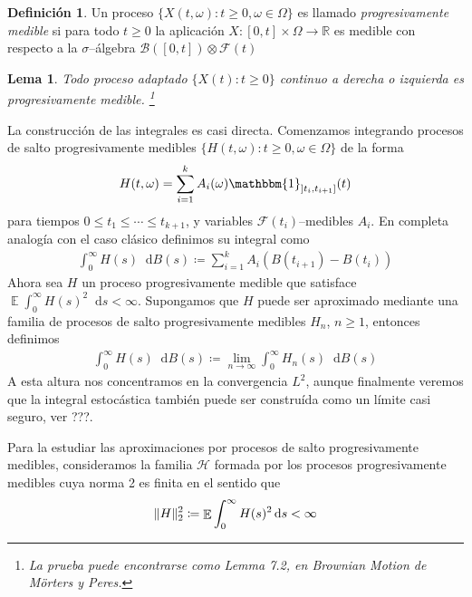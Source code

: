 \documentclass{article}
\newcommand{\morters}{Mörters}
\newcommand{\characteristic}{\mathbbm{1}}
\newcommand{\events}{\mathcal{F}}
\newcommand{\borel}{\mathcal{B}}
\newcommand{\brownian}{B}
\newcommand{\dd}{\mathop{}\!\mathrm{d}}
\newcommand{\realNumbers}{\mathbb{R}}
\DeclareMathOperator{\Expectation}{\mathbb{E}}
\DeclarePairedDelimiter{\norm}{\|}{\|}
\theoremstyle{plain}
\newtheorem{lemma}{Lema}
\theoremstyle{remark}
\theoremstyle{definition}
\newtheorem{definition}{Definición}
\begin{document}
\begin{definition}
  Un proceso \(\{X(t, \omega) : t \geq 0, \omega \in \Omega\}\) es llamado \emph{progresivamente medible} si para todo \(t \geq 0\) la aplicación \(X : [0, t] \times \Omega \rightarrow \realNumbers\) es medible con respecto a la \(\sigma\)--álgebra \(\borel([0, t]) \otimes \events(t)\)
\end{definition}

\begin{lemma}
  Todo proceso adaptado \(\{X(t) : t \geq 0\}\) continuo a derecha o izquierda es progresivamente medible.
  \footnote{La prueba puede encontrarse como Lemma 7.2, en Brownian Motion de \morters{} y Peres.}
\end{lemma}

La construcción de las integrales es casi directa.
Comenzamos integrando procesos de salto progresivamente medibles \(\{H(t, \omega) : t \geq 0, \omega \in \Omega\}\) de la forma
\begin{align}
  H(t, \omega)
  =
  \sum_{i = 1}^k A_i(\omega)\characteristic_{\left] t_i, t_{i + 1} \right]}(t)
\end{align}
para tiempos \(0 \leq t_1 \leq \cdots \leq t_{k + 1}\), y variables \(\events(t_i)\)--medibles \(A_i\).
En completa analogía con el caso clásico definimos su integral como
\begin{align}
  \int_0^{\infty} H(s) \dd \brownian(s)
  \coloneqq
  \sum_{i = 1}^k A_i (\brownian(t_{i + 1}) - \brownian(t_i))
\end{align}
Ahora sea \(H\) un proceso progresivamente medible que satisface \(\Expectation \int_0^{\infty} H(s)^2 \dd s < \infty\).
Supongamos que \(H\) puede ser aproximado mediante una familia de procesos de salto progresivamente medibles \(H_n\), \(n \geq 1\), entonces definimos
\begin{align}
  \int_0^\infty H(s) \dd \brownian(s)
  \coloneqq
  \lim_{n \rightarrow \infty} \int_0^\infty H_n(s) \dd \brownian(s)
  \label{definition:stochasticIntegralWithRespectToBrownianMotion_norm2Approximation}
\end{align}
A esta altura nos concentramos en la convergencia \(L^2\), aunque finalmente veremos que la integral estocástica también puede ser construída como un límite casi seguro, ver ???.

Para la estudiar las aproximaciones por procesos de salto progresivamente medibles, consideramos la familia \(\mathcal{H}\) formada por los procesos progresivamente medibles cuya norma 2 es finita en el sentido que
\begin{align}
  \norm{H}_2^2
  \coloneqq
  \Expectation \int_0^{\infty} H(s)^2 \dd s
  <
  \infty
\end{align}
\end{document}
